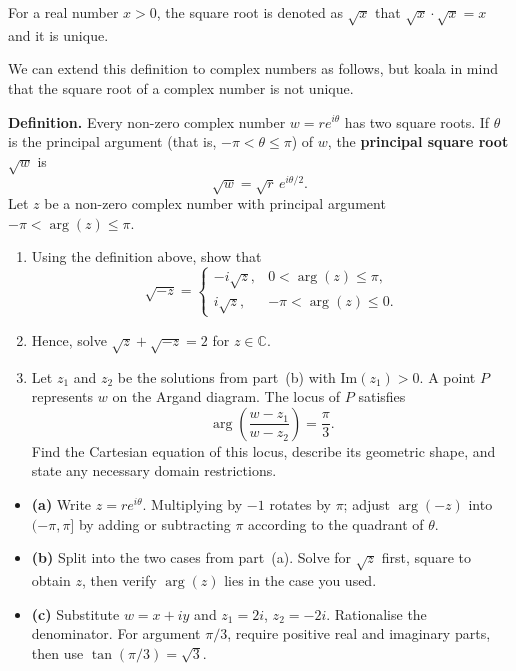\begin{problem}

For a real number $x > 0$, the square root is denoted as $ \sqrt{x} $ that $ \sqrt{x} \cdot \sqrt{x} = x $ and it is unique. 

We can extend this definition to complex numbers as follows, 
but koala in mind that the square root of a complex number is not unique.

\textbf{Definition.} Every non-zero complex number $w = re^{i\theta}$ has two square roots. If $\theta$ is the principal argument
(that is, $-\pi < \theta \le \pi$) of $w$, the \textbf{principal square root} $\sqrt{w}$ is
\[
\sqrt{w} = \sqrt{r}\,e^{i\theta/2}.
\]
Let $z$ be a non-zero complex number with principal argument $-\pi < \arg(z) \le \pi$.

\begin{enumerate}[label=(\alph*),leftmargin=*]
  \item Using the definition above, show that
  \[
  \sqrt{-z} =
  \begin{cases}
    -i\sqrt{z}, & 0 < \arg(z) \le \pi,\\[4pt]
    i\sqrt{z}, & -\pi < \arg(z) \le 0.
  \end{cases}
  \]
  \item Hence, solve $\sqrt{z} + \sqrt{-z} = 2$ for $z \in \mathbb{C}$.
  \item Let $z_1$ and $z_2$ be the solutions from part~(b) with $\text{Im}(z_1) > 0$. A point $P$ represents $w$ on the Argand diagram. The locus of $P$ satisfies
  \[
  \arg\left(\frac{w - z_1}{w - z_2}\right) = \frac{\pi}{3}.
  \]
  Find the Cartesian equation of this locus, describe its geometric shape, and state any necessary domain restrictions.
\end{enumerate}
\end{problem}

\begin{hint}
\begin{itemize}[leftmargin=*]
  \item \textbf{(a)} Write $z = re^{i\theta}$. Multiplying by $-1$ rotates by $\pi$; adjust $\arg(-z)$ into $(-\pi,\pi]$ by adding or subtracting $\pi$ according to the quadrant of $\theta$.
  \item \textbf{(b)} Split into the two cases from part~(a). Solve for $\sqrt{z}$ first, square to obtain $z$, then verify $\arg(z)$ lies in the case you used.
  \item \textbf{(c)} Substitute $w = x + iy$ and $z_1 = 2i$, $z_2 = -2i$. Rationalise the denominator. For argument $\pi/3$, require positive real and imaginary parts, then use $\tan(\pi/3) = \sqrt{3}$.
\end{itemize}
\end{hint}

